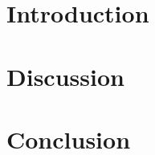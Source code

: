 \documentclass[conference]{IEEEtran}
\begin{document}


\title{\maintitle}
\author{\FirstName~\LastName $^\star$ \\%
$^\star$\Organisation \\%
Email: \Email}%


\maketitle
\IEEEpeerreviewmaketitle

\begin{abstract} \label{Sec:Abstract}
\lipsum[10]
\end{abstract}

\section{Introduction} \label{Sec:Introduction}
\lipsum[1-2] \cite{refernce1,refernce2,refernce3,refernce4}

\section{Discussion} \label{Sec:Discussion}
\lipsum[3-5]

\section{Conclusion} \label{Sec:Conclusion}
\lipsum[6]



\end{document}
